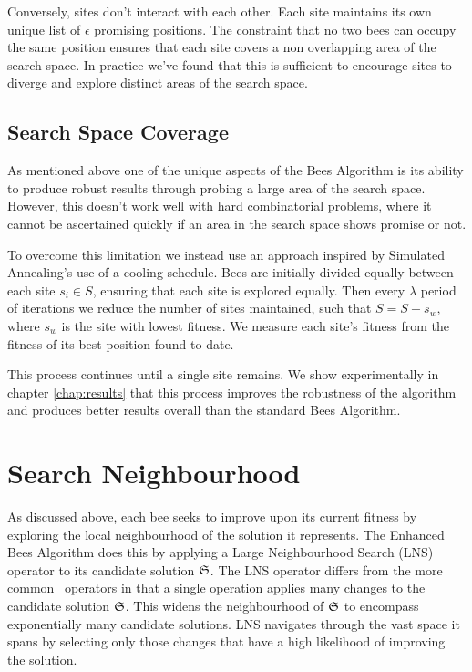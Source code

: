 Conversely, sites don't interact with each other. Each site maintains its own unique list of $\epsilon$ promising positions. The constraint that no two bees can occupy the same position ensures that each site covers a non overlapping area of the search space. In practice we've found that this is sufficient to encourage sites to diverge and explore distinct areas of the search space.    


\subsection{Search Space Coverage}
\label{subsec:searchspacecoverage}

As mentioned above one of the unique aspects of the Bees Algorithm is its ability to produce robust results through probing a large area of the search space. However, this doesn't work well with hard combinatorial problems, where it cannot be ascertained quickly if an area in the search space shows promise or not. 

To overcome this limitation we instead use an approach inspired by Simulated Annealing's use of a cooling schedule. Bees are initially divided equally between each site $s_i \in S$, ensuring that each site is explored equally. Then every $\lambda$ period of iterations we reduce the number of sites maintained, such that $S = S - s_w$, where $s_w$ is the site with lowest fitness. We measure each site's fitness from the fitness of its best position found to date.

This process continues until a single site remains. We show experimentally in chapter \ref{chap:results} that this process improves the robustness of the algorithm and produces better results overall than the standard Bees Algorithm. 

\section{Search Neighbourhood}
\label{sec:searchneighbourhood}

As discussed above, each bee seeks to improve upon its current fitness by exploring the local neighbourhood of the solution it represents. The Enhanced Bees Algorithm does this by applying a Large Neighbourhood Search (LNS) operator to its candidate solution $\mathfrak{S}$. The LNS operator differs from the more common \VRP\ operators in that a single operation applies many changes to the candidate solution $\mathfrak{S}$. This widens the neighbourhood of $\mathfrak{S}$ to encompass exponentially many candidate solutions. LNS navigates through the vast space it spans by selecting only those changes that have a high likelihood of improving the solution.

